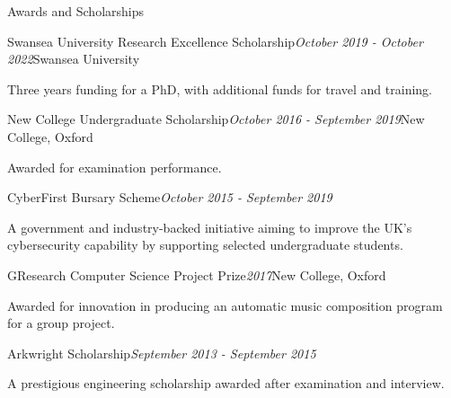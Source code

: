 \documentclass{resume} %
\begin{document}
\begin{rSection}{Awards and Scholarships} \itemsep -2pt

\begin{rSubsection}{Swansea University Research Excellence  Scholarship}{\em October 2019 - October 2022}{}{Swansea University}
	\item Three years funding for a PhD, with additional funds for travel and training.
\end{rSubsection}

\begin{rSubsection}{New College Undergraduate Scholarship}{\em October 2016 - September 2019}{}{New College, Oxford}
	\item Awarded for examination performance.
\end{rSubsection}


\begin{rSubsection}{CyberFirst Bursary Scheme}{\em October 2015 - September 2019}{}{}
	\item A government and industry-backed initiative aiming to improve the UK's cybersecurity capability by supporting selected undergraduate students.
\end{rSubsection}


\begin{rSubsection}{GResearch Computer Science Project Prize}{\em 2017}{}{New College, Oxford}
	\item Awarded for innovation in producing an automatic music composition program for a group project.
\end{rSubsection}


\begin{rSubsection}{Arkwright Scholarship}{\em September 2013 - September 2015}{}{}
	\item A prestigious engineering scholarship awarded after examination and interview.
\end{rSubsection}

\end{rSection}

\end{document}
